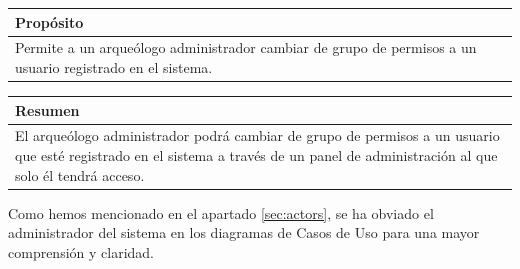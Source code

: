     \begin{table}[H]
        \centering
        \begin{tabularx}{\textwidth}{@{} |L |@{}} \hline
            \textbf{Propósito} \\
            \hline
            Permite a un arqueólogo administrador cambiar de grupo de permisos a un usuario
            registrado en el sistema. \\
            \hline
        \end{tabularx}
    \end{table}

    \begin{table}[H]
        \centering
        \begin{tabularx}{\textwidth}{@{} |L |@{}} \hline
            \textbf{Resumen} \\
            \hline
            El arqueólogo administrador podrá cambiar de grupo de permisos a un usuario que esté
            registrado en el sistema a través de un panel de administración al que solo él tendrá
            acceso. \\
            \hline
        \end{tabularx}
    \end{table}

Como hemos mencionado en el apartado \ref{sec:actors}, se ha obviado el administrador del
sistema en los diagramas de Casos de Uso para una mayor comprensión y claridad.
